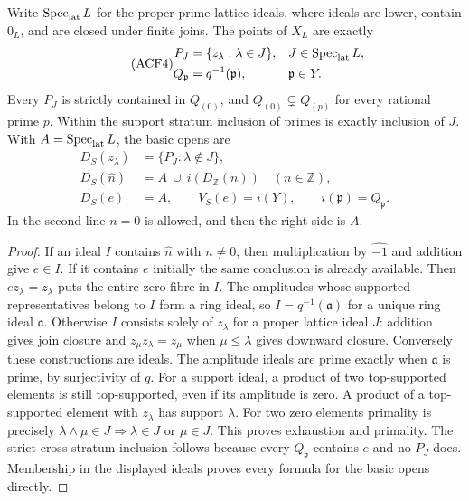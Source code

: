 \begin{proposition}
Write $\operatorname{Spec}_{\rm lat}L$ for the proper prime lattice ideals,
where ideals are lower, contain $0_L$, and are closed under finite joins.
The points of $X_L$ are exactly
\begin{equation}\tag{ACF4}
 \begin{aligned}
 P_J&=\{z_\lambda:\lambda\in J\},
                  &&J\in\operatorname{Spec}_{\rm lat}L,\\
 Q_{\mathfrak p}&=q^{-1}(\mathfrak p),
                  &&\mathfrak p\in Y.
 \end{aligned}
\end{equation}
Every $P_J$ is strictly contained in $Q_{(0)}$, and
$Q_{(0)}\subsetneq Q_{(p)}$ for every rational prime $p$.
Within the support stratum inclusion of primes is exactly inclusion of
$J$. With $A=\operatorname{Spec}_{\rm lat}L$, the basic opens are
\begin{equation}\tag{ACF5}
 \begin{aligned}
 D_S(z_\lambda)&=\{P_J:\lambda\notin J\},\\
 D_S(\widehat n)&=A\ \cup\ i(D_{\mathbb Z}(n))\quad(n\in\mathbb Z),\\
 D_S(e)&=A,\qquad V_S(e)=i(Y),\qquad
 i(\mathfrak p)=Q_{\mathfrak p}.
 \end{aligned}
\end{equation}
In the second line $n=0$ is allowed, and then the right side is $A$.
\end{proposition}
\begin{proof}
If an ideal $I$ contains $\widehat n$ with $n\ne0$, then multiplication
by $\widehat{-1}$ and addition give $e\in I$. If it contains $e$
initially the same conclusion is already available. Then
$ez_\lambda=z_\lambda$ puts the entire zero fibre in $I$.
The amplitudes whose supported representatives belong to $I$ form a ring
ideal, so $I=q^{-1}(\mathfrak a)$ for a unique ring ideal
$\mathfrak a$. Otherwise $I$ consists solely of $z_\lambda$ for a proper
lattice ideal $J$: addition gives join closure and
$z_\mu z_\lambda=z_\mu$ when $\mu\le\lambda$ gives downward closure.
Conversely these constructions are ideals. The amplitude ideals are
prime exactly when $\mathfrak a$ is prime, by surjectivity of $q$.
For a support ideal, a product of two top-supported elements is
still top-supported, even if its amplitude is zero. A product
of a top-supported element with $z_\lambda$ has support $\lambda$.
For two zero elements primality is precisely
$\lambda\wedge\mu\in J\Rightarrow\lambda\in J$ or $\mu\in J$.
This proves exhaustion and primality. The strict cross-stratum inclusion
follows because every $Q_{\mathfrak p}$ contains $e$ and no $P_J$ does.
Membership in the displayed ideals proves every formula for the basic
opens directly.
\end{proof}

